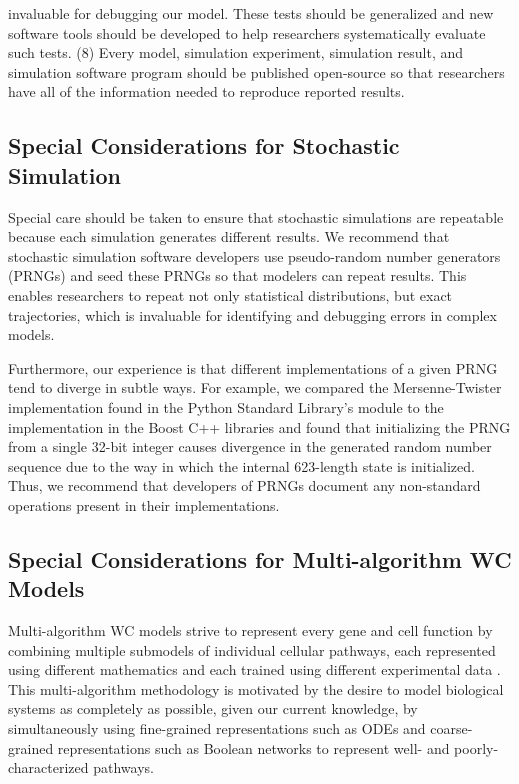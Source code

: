 \documentclass[journal,transmag,twoside]{IEEEtran}
\begin{document}
invaluable for debugging our model. These tests should be generalized and new software tools should be developed to help researchers systematically evaluate such tests. (8) Every model, simulation experiment, simulation result, and simulation software program should be published open-source so that researchers have all of the information needed to reproduce reported results.

\subsection{Special Considerations for Stochastic Simulation}
Special care should be taken to ensure that stochastic simulations are repeatable because each simulation generates different results. We recommend that stochastic simulation software developers use pseudo-random number generators (PRNGs) and seed these PRNGs so that modelers can repeat results. This enables researchers to repeat not only statistical distributions, but exact trajectories, which is invaluable for identifying and debugging errors in complex models.

Furthermore, our experience is that different implementations of a given PRNG tend to diverge in subtle ways. For example, we compared the Mersenne-Twister \cite{matsumoto1998mersenne} implementation found in the Python Standard Library's  module to the implementation in the Boost C++ libraries \cite{schaling2011boost} and found that initializing the PRNG from a single 32-bit integer causes divergence in the generated random number sequence due to the way in which the internal 623-length state is initialized. Thus, we recommend that developers of PRNGs document any non-standard operations present in their implementations.

\subsection{Special Considerations for Multi-algorithm WC Models}
Multi-algorithm WC models strive to represent every gene and cell function by combining multiple submodels of individual cellular pathways, each represented using different mathematics and each trained using different experimental data \cite{Karr2015, macklin2014future, carrera2015build}. This multi-algorithm methodology is motivated by the desire to model biological systems as completely as possible, given our current knowledge, by simultaneously using fine-grained representations such as ODEs and coarse-grained representations such as Boolean networks to represent well- and poorly-characterized pathways. 
\end{document}

